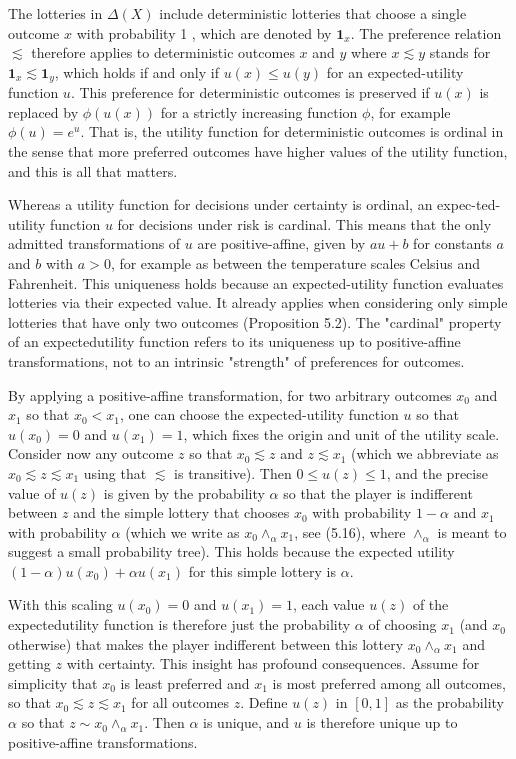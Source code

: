 \documentclass[12pt]{article}
\begin{document}
The lotteries in $\Delta(X)$ include deterministic lotteries that choose a single outcome $x$ with probability 1 , which are denoted by $\mathbf{1}_{x}$. The preference relation $\lesssim$ therefore applies to deterministic outcomes $x$ and $y$ where $x \lesssim y$ stands for $\mathbf{1}_{x} \lesssim \mathbf{1}_{y}$, which holds if and only if $u(x) \leq u(y)$ for an expected-utility function $u$. This preference for deterministic outcomes is preserved if $u(x)$ is replaced by $\phi(u(x))$ for a strictly increasing function $\phi$, for example $\phi(u)=e^{u}$. That is, the utility function for deterministic outcomes is ordinal in the sense that more preferred outcomes have higher values of the utility function, and this is all that matters.

Whereas a utility function for decisions under certainty is ordinal, an expec-ted-utility function $u$ for decisions under risk is cardinal. This means that the only admitted transformations of $u$ are positive-affine, given by $a u+b$ for constants $a$ and $b$ with $a>0$, for example as between the temperature scales Celsius and Fahrenheit. This uniqueness holds because an expected-utility function evaluates lotteries via their expected value. It already applies when considering only simple lotteries that have only two outcomes (Proposition 5.2). The "cardinal" property of an expectedutility function refers to its uniqueness up to positive-affine transformations, not to an intrinsic "strength" of preferences for outcomes.

By applying a positive-affine transformation, for two arbitrary outcomes $x_{0}$ and $x_{1}$ so that $x_{0}<x_{1}$, one can choose the expected-utility function $u$ so that $u\left(x_{0}\right)=0$ and $u\left(x_{1}\right)=1$, which fixes the origin and unit of the utility scale. Consider now any outcome $z$ so that $x_{0} \lesssim z$ and $z \lesssim x_{1}$ (which we abbreviate as $x_{0} \lesssim z \lesssim x_{1}$ using that $\lesssim$ is transitive). Then $0 \leq u(z) \leq 1$, and the precise value of $u(z)$ is given by the probability $\alpha$ so that the player is indifferent between $z$ and the simple lottery that chooses $x_{0}$ with probability $1-\alpha$ and $x_{1}$ with probability $\alpha$ (which we write as $x_{0} \wedge_{\alpha} x_{1}$, see (5.16), where $\wedge_{\alpha}$ is meant to suggest a small probability tree). This holds because the expected utility $(1-\alpha) u\left(x_{0}\right)+\alpha u\left(x_{1}\right)$ for this simple lottery is $\alpha$.

With this scaling $u\left(x_{0}\right)=0$ and $u\left(x_{1}\right)=1$, each value $u(z)$ of the expectedutility function is therefore just the probability $\alpha$ of choosing $x_{1}$ (and $x_{0}$ otherwise) that makes the player indifferent between this lottery $x_{0} \wedge_{\alpha} x_{1}$ and getting $z$ with certainty. This insight has profound consequences. Assume for simplicity that $x_{0}$ is least preferred and $x_{1}$ is most preferred among all outcomes, so that $x_{0} \lesssim z \lesssim x_{1}$ for all outcomes $z$. Define $u(z)$ in $[0,1]$ as the probability $\alpha$ so that $z \sim x_{0} \wedge_{\alpha} x_{1}$. Then $\alpha$ is unique, and $u$ is therefore unique up to positive-affine transformations.
\end{document}
